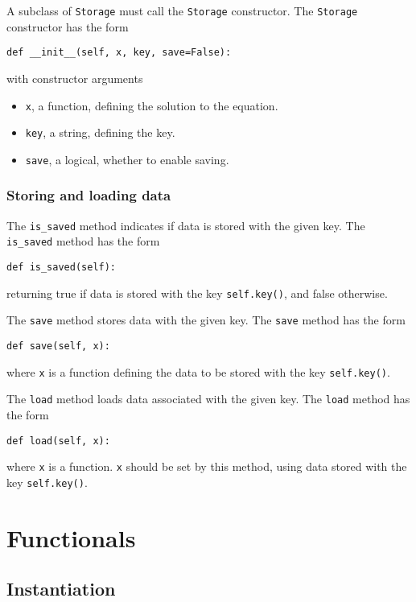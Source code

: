 \documentclass[11pt]{article}
\begin{document}
A subclass of \texttt{Storage} must call the \texttt{Storage} constructor. The
\texttt{Storage} constructor has the form
\begin{lstlisting}
def __init__(self, x, key, save=False):
\end{lstlisting}
with constructor arguments
\begin{itemize}
  \item \texttt{x}, a function, defining the solution to the equation.
  \item \texttt{key}, a string, defining the key.
  \item \texttt{save}, a logical, whether to enable saving.
\end{itemize}

\subsubsection{Storing and loading data}

The \texttt{is\_saved} method indicates if data is stored with the given key.
The \texttt{is\_saved} method has the form
\begin{lstlisting}
def is_saved(self):
\end{lstlisting}
returning true if data is stored with the key \texttt{self.key()}, and false
otherwise.

The \texttt{save} method stores data with the given key. The \texttt{save}
method has the form
\begin{lstlisting}
def save(self, x):
\end{lstlisting}
where \texttt{x} is a function defining the data to be stored with the
key \texttt{self.key()}.

The \texttt{load} method loads data associated with the given key. The
\texttt{load} method has the form
\begin{lstlisting}
def load(self, x):
\end{lstlisting}
where \texttt{x} is a function. \texttt{x} should be set by this method, using
data stored with the key \texttt{self.key()}.

\section{Functionals}\label{sect:Functional} 

\subsection{Instantiation}
\end{document}
